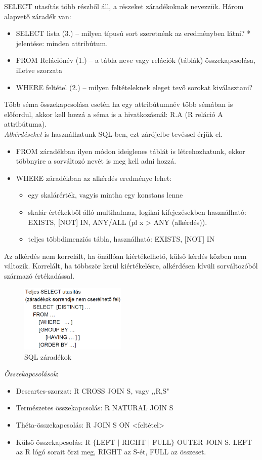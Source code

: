 \documentclass[margin=0px]{article}
\begin{document}
SELECT utasítás több részből áll, a részeket záradékoknak nevezzük. Három alapvető záradék van:
\begin{itemize}
    \item SELECT lista (3.) -- milyen típusú sort szeretnénk az eredményben látni? * jelentése: minden attribútum.
    \item FROM Relációnév (1.) -- a tábla neve vagy relációk (táblák) összekapcsolása, illetve szorzata
    \item WHERE feltétel (2.) -- milyen feltételeknek eleget tevő sorokat kiválasztani?
\end{itemize}
Több séma összekapcsolása esetén ha egy attribútumnév több sémában is előfordul, akkor kell hozzá a séma is a hivatkozásnál: R.A (R reláció A attribútuma). \\
\textit{Alkérdéseket} is használhatunk SQL-ben, ezt zárójelbe tevéssel érjük el.\\
\begin{itemize}
    \item FROM záradékban ilyen módon ideiglenes táblát is létrehozhatunk, ekkor többnyire a sorváltozó nevét is meg kell adni hozzá.
    \item WHERE záradékban az alkérdés eredménye lehet:
          \begin{itemize}
              \item egy skalárérték, vagyis mintha egy konstans lenne
              \item skalár értékekből álló multihalmaz, logikai kifejezésekben használható: EXISTS, [NOT] IN, ANY/ALL (pl x > ANY (alkérdés)).
              \item teljes többdimenziós tábla, használható: EXISTS, [NOT] IN
          \end{itemize}
\end{itemize}
Az alkérdés nem korrelált, ha önállóan kiértékelhető, külső kérdés közben nem változik. Korrelált, ha többször kerül kiértékelésre, alkérdésen kívüli sorváltozóból származó értékadással.
\begin{figure}[H]
    \centering
    \includegraphics[width=0.45\textwidth]{img/sql1.png}
    \caption{SQL záradékok}
\end{figure}
\textit{Összekapcsolások}:
\begin{itemize}
    \item Descartes-szorzat: R CROSS JOIN S, vagy ,,R,S"
    \item Természetes összekapcsolás: R NATURAL JOIN S
    \item Théta-összekapcsolás: R JOIN S ON <feltétel>
    \item Külső összekapcsolás: R $\{$LEFT $|$ RIGHT $|$ FULL$\}$ OUTER JOIN S. LEFT az R lógó sorait őrzi meg, RIGHT az S-ét, FULL az összeset.
\end{itemize}
\end{document}

